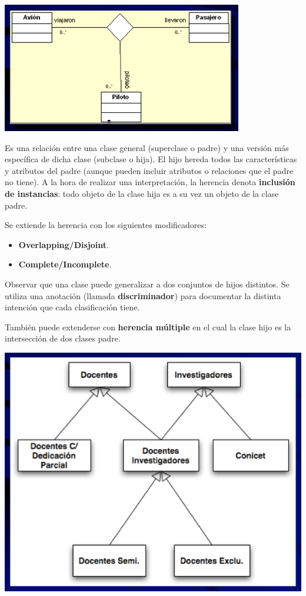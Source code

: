 \documentclass[]{article}
\begin{document}
\begin{center}
	\includegraphics[scale=0.6]{Narias.png}
\end{center}

Es una relación entre una clase general (superclase o padre) y una versión más específica de dicha clase (subclase o hija). El hijo hereda todos las características y atributos del padre (aunque pueden incluir atributos o relaciones que el padre no tiene). A la hora de realizar una interpretación, la herencia denota \textbf{inclusión de instancias}: todo objeto de la clase hija es a su vez un objeto de la clase padre.

Se extiende la herencia con los siguientes modificadores:
\begin{itemize}
	\item \textbf{Overlapping/Disjoint}.
	\item \textbf{Complete/Incomplete}.
\end{itemize}

Observar que una clase puede generalizar a dos conjuntos de hijos distintos. Se utiliza una anotación (llamada \textbf{discriminador}) para documentar la distinta intención que cada clasificación tiene.

También puede extenderse con \textbf{herencia múltiple} en el cual la clase hijo es la intersección de dos clases padre.


\begin{center}
	\includegraphics[scale=0.5]{Herencia.png}
\end{center}
\end{document}
